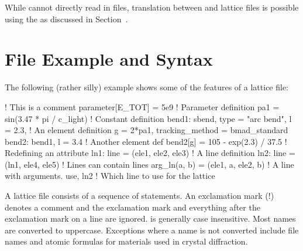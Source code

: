 While \bmad cannot directly read in \mad\cite{b:maduser} files, 
translation between \mad and \bmad lattice files is possible using
the  as discussed in Section~.

\section{File Example and Syntax}

The following (rather silly) example shows some of the features of a
\bmad lattice file:
\begin{example}
  ! This is a comment
  parameter[E_TOT] = 5e9                   ! Parameter definition
  pa1 = sin(3.47 * pi / c_light)                 ! Constant definition
  bend1: sbend, type = "arc bend", l = 2.3,      ! An element definition
      g = 2*pa1, tracking_method = bmad_standard
  bend2: bend1, l = 3.4                          ! Another element def
  bend2[g] = 105 - exp(2.3) / 37.5               ! Redefining an attribute
  ln1: line = (ele1, ele2, ele3)                 ! A line definition
  ln2: line = (ln1, ele4, ele5)                  ! Lines can contain lines
  arg_ln(a, b) = (ele1, a, ele2, b)              ! A line with arguments.
  use, ln2                                       ! Which line to use for the lattice
\end{example}

A \bmad lattice file consists of a sequence of statements. An
exclamation mark (!) denotes a comment and the exclamation mark and
everything after the exclamation mark on a line are ignored.  \bmad is
generally case insensitive. Most names are converted to
uppercase. Exceptions where a name is not converted include file names
and atomic formulas for materials used in crystal diffraction.

